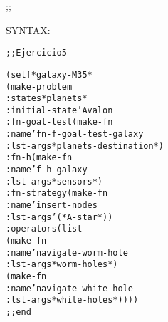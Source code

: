 \begin{aibox}{\function}
;; 

SYNTAX: 
\end{aibox}

\begin{aibox}{\examples}
\begin{alltt}
\end{alltt}

\end{aibox}

\begin{aibox}{\comments}

\end{aibox}
\begin{aibox}{\answers}

\end{aibox}
\begin{aibox}{\othercomments}

\end{aibox}
\begin{aibox}{\pseudocode}

\end{aibox}
\begin{aibox}{\code}

\begin{alltt}
;; Ejercicio 5

(setf *galaxy-M35*
    (make-problem
        :states *planets*
        :initial-state 'Avalon
        :fn-goal-test (make-fn
                          :name 'fn-f-goal-test-galaxy
                        :lst-args *planets-destination*)
        :fn-h (make-fn
                  :name 'f-h-galaxy
                :lst-args *sensors*)
        :fn-strategy (make-fn
                         :name 'insert-nodes
                           :lst-args '(*A-star*))
        :operators (list
                    (make-fn
                        :name 'navigate-worm-hole 
                        :lst-args *worm-holes*)
                    (make-fn
                        :name 'navigate-white-hole
                        :lst-args *white-holes*))))
;; end


\end{alltt}
\end{aibox}
